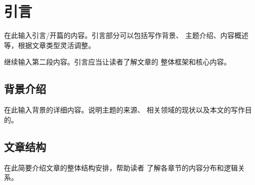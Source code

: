 
\section{引言}

在此输入引言/开篇的内容。引言部分可以包括写作背景、
主题介绍、内容概述等，根据文章类型灵活调整。

继续输入第二段内容。引言应当让读者了解文章的
整体框架和核心内容。

\subsection{背景介绍}

在此输入背景的详细内容。说明主题的来源、
相关领域的现状以及本文的写作目的。

\subsection{文章结构}

在此简要介绍文章的整体结构安排，帮助读者
了解各章节的内容分布和逻辑关系。
